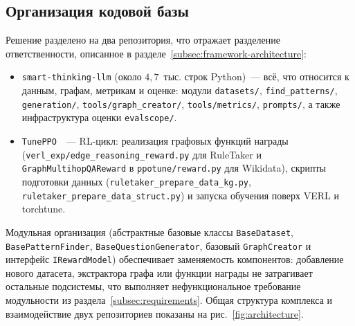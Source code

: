\subsection{Организация кодовой базы}
\label{subsec:impl-structure}

Решение разделено на два репозитория, что отражает разделение ответственности, описанное в разделе~\ref{subsec:framework-architecture}:
\begin{itemize}
    \setlength{\itemsep}{\smallskipamount}
    \item \texttt{smart-thinking-llm} (около $4{,}7$~тыс. строк Python)~--- всё, что относится к данным, графам, метрикам и оценке: модули \texttt{datasets/}, \texttt{find\_patterns/}, \texttt{generation/}, \texttt{tools/graph\_creator/}, \texttt{tools/metrics/}, \texttt{prompts/}, а также инфраструктура оценки \texttt{evalscope/}.
    \item \texttt{TunePPO}~\cite{tuneppo2024}~--- RL-цикл: реализация графовых функций награды (\texttt{verl\_exp/\allowbreak edge\_rea\-soning\_reward.py} для RuleTaker и \texttt{GraphMultihop\allowbreak QAReward} в \texttt{ppotune/\allowbreak reward.py} для Wikidata), скрипты подготовки данных (\texttt{ruletaker\_\allowbreak prepare\_\allowbreak data\_kg.py}, \texttt{ruletaker\_\allowbreak prepare\_\allowbreak data\_struct.py}) и запуска обучения поверх VERL и torchtune.
\end{itemize}

Модульная организация (абстрактные базовые классы \texttt{BaseDataset}, \texttt{BasePatternFinder}, \texttt{BaseQuestionGenerator}, базовый \texttt{GraphCreator} и интерфейс \texttt{IRewardModel}) обеспечивает заменяемость компонентов: добавление нового датасета, экстрактора графа или функции награды не затрагивает остальные подсистемы, что выполняет нефункциональное требование модульности из раздела~\ref{subsec:requirements}. Общая структура комплекса и взаимодействие двух репозиториев показаны на рис.~\ref{fig:architecture}.

